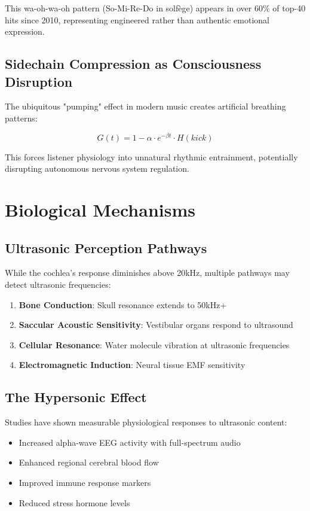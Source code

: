 \documentclass[12pt,a4paper]{article}
\begin{document}
This wa-oh-wa-oh pattern (So-Mi-Re-Do in solfège) appears in over 60\% of top-40 hits since 2010, representing engineered rather than authentic emotional expression.

\subsection{Sidechain Compression as Consciousness Disruption}

The ubiquitous "pumping" effect in modern music creates artificial breathing patterns:

\begin{equation}
G(t) = 1 - \alpha \cdot e^{-\beta t} \cdot H(kick)
\end{equation}

This forces listener physiology into unnatural rhythmic entrainment, potentially disrupting autonomous nervous system regulation.

\section{Biological Mechanisms}

\subsection{Ultrasonic Perception Pathways}

While the cochlea's response diminishes above 20kHz, multiple pathways may detect ultrasonic frequencies:

\begin{enumerate}
\item \textbf{Bone Conduction}: Skull resonance extends to 50kHz+
\item \textbf{Saccular Acoustic Sensitivity}: Vestibular organs respond to ultrasound
\item \textbf{Cellular Resonance}: Water molecule vibration at ultrasonic frequencies
\item \textbf{Electromagnetic Induction}: Neural tissue EMF sensitivity
\end{enumerate}

\subsection{The Hypersonic Effect}

Studies have shown measurable physiological responses to ultrasonic content:

\begin{itemize}
\item Increased alpha-wave EEG activity with full-spectrum audio
\item Enhanced regional cerebral blood flow
\item Improved immune response markers
\item Reduced stress hormone levels
\end{itemize}
\end{document}
